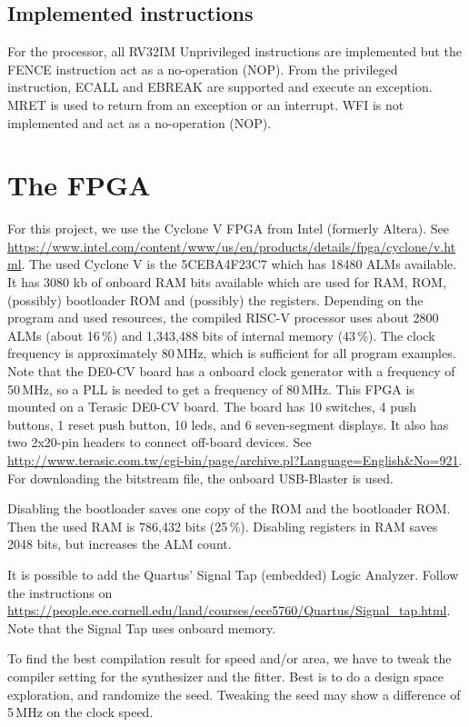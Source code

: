 \documentclass[12pt]{article}
\begin{document}
\subsection{Implemented instructions}
For the processor, all RV32IM Unprivileged instructions are implemented but the FENCE instruction act as a no-operation (NOP). From the privileged instruction, ECALL and EBREAK are supported and execute an exception. MRET is used to return from an exception or an interrupt. WFI is not implemented and act as a no-operation (NOP).

\section{The FPGA}
For this project, we use the Cyclone V FPGA from Intel (formerly Altera). See \url{https://www.intel.com/content/www/us/en/products/details/fpga/cyclone/v.html}.
The used Cyclone V is the 5CEBA4F23C7 which has 18480 ALMs available. It has 3080 kb of onboard RAM bits available which are used for RAM, ROM, (possibly) bootloader ROM and (possibly) the registers. Depending on the program and used resources, the compiled RISC-V processor uses about 2800 ALMs (about 16\,\%) and 1,343,488 bits of internal memory (43\,\%). The clock frequency is approximately 80\,MHz, which is sufficient for all program examples. Note that the DE0-CV board has a onboard clock generator with a frequency of 50\,MHz, so a PLL is needed to get a frequency of 80\,MHz. This FPGA is mounted on a Terasic DE0-CV board. The board has 10 switches, 4 push buttons, 1 reset push button, 10 leds, and 6 seven-segment displays. It also has two 2x20-pin headers to connect off-board devices. See \url{http://www.terasic.com.tw/cgi-bin/page/archive.pl?Language=English&No=921}. For downloading the bitstream file, the onboard USB-Blaster is used.

Disabling the bootloader saves one copy of the ROM and the bootloader ROM. Then the used RAM is 786,432 bits (25\,\%). Disabling registers in RAM saves 2048 bits, but increases the ALM count.

It is possible to add the Quartus' Signal Tap (embedded) Logic Analyzer. Follow the instructions on \url{https://people.ece.cornell.edu/land/courses/ece5760/Quartus/Signal_tap.html}. Note that the Signal Tap uses onboard memory.

To find the best compilation result for speed and/or area, we have to tweak the compiler setting for the synthesizer and the fitter. Best is to do a design space exploration, and randomize the seed. Tweaking the seed may show a difference of 5\,MHz on the clock speed.
\end{document}
